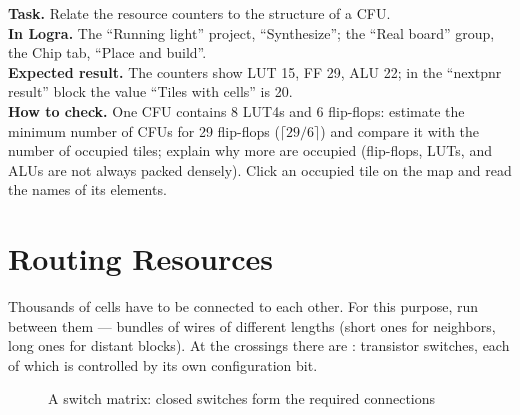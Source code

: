 \begin{diybox}
\textbf{Task.} Relate the resource counters to the structure of a CFU.\\
\textbf{In Logra.} The ``Running light'' project, ``Synthesize''; the ``Real board'' group, the Chip tab, ``Place and build''.\\
\textbf{Expected result.} The counters show LUT 15, FF 29, ALU 22; in the ``nextpnr result'' block the value ``Tiles with cells'' is 20.\\
\textbf{How to check.} One CFU contains 8 LUT4s and 6 flip-flops: estimate the minimum number of CFUs for 29 flip-flops ($\lceil 29/6\rceil$) and compare it with the number of occupied tiles; explain why more are occupied (flip-flops, LUTs, and ALUs are not always packed densely).  Click an occupied tile on the map and read the names of its elements.
\end{diybox}

\section{Routing Resources}

Thousands of cells have to be connected to each other. For this purpose,
 run between them --- bundles of wires of different lengths (short ones for
neighbors, long ones for distant blocks). At the crossings there are
: transistor switches, each of which
is controlled by its own configuration bit.

\begin{figure}[H]
\centering
{}
\caption{A switch matrix: closed switches form the required connections}
\end{figure}

